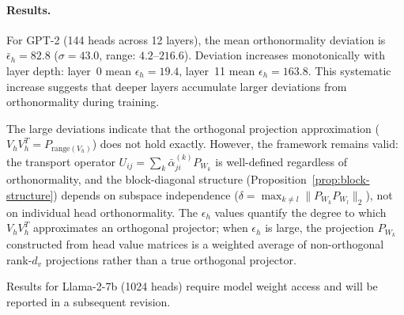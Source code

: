 \paragraph{Results.}
For GPT-2 (144 heads across 12 layers), the mean orthonormality deviation is
$\bar{\epsilon}_h = 82.8$ ($\sigma = 43.0$, range: $4.2$--$216.6$). Deviation
increases monotonically with layer depth: layer~0 mean $\epsilon_h = 19.4$,
layer~11 mean $\epsilon_h = 163.8$. This systematic increase suggests that
deeper layers accumulate larger deviations from orthonormality during training.

The large deviations indicate that the orthogonal projection approximation
($V_h V_h^T = P_{\mathrm{range}(V_h)}$) does not hold exactly. However, the
framework remains valid: the transport operator $U_{ij} = \sum_k
\bar{\alpha}_{ji}^{(k)} P_{W_k}$ is well-defined regardless of orthonormality,
and the block-diagonal structure (Proposition~\ref{prop:block-structure}) depends
on subspace independence ($\delta = \max_{k \neq l} \|P_{W_k} P_{W_l}\|_2$),
not on individual head orthonormality. The $\epsilon_h$ values quantify the
degree to which $V_h V_h^T$ approximates an orthogonal projector; when
$\epsilon_h$ is large, the projection $P_{W_k}$ constructed from head value
matrices is a weighted average of non-orthogonal rank-$d_v$ projections rather
than a true orthogonal projector.

Results for Llama-2-7b (1024 heads) require model weight access and will be
reported in a subsequent revision.
